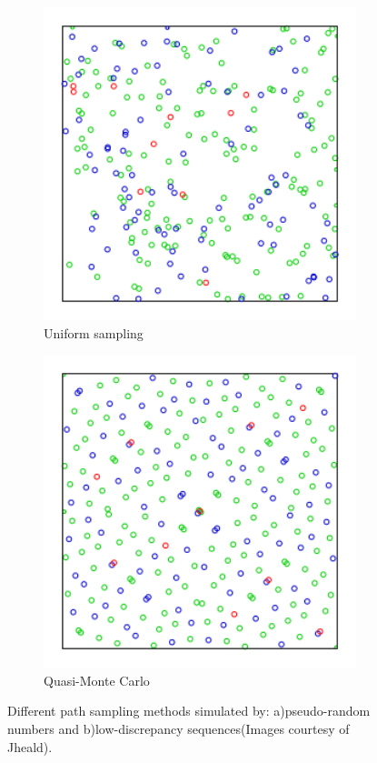 \begin{figure}\label{f:path-sampling-1}
	\begin{subfigure}[b]{0.4\textwidth}
		\includegraphics[width=1.0\textwidth]{graphics/gi/path-7-1}
		\caption{Uniform sampling}
	\end{subfigure}
	\begin{subfigure}[b]{0.4\textwidth}
		\includegraphics[width=1.0\textwidth]{graphics/gi/path-7-2}
		\caption{Quasi-Monte Carlo}
	\end{subfigure}
	\caption{Different path sampling methods simulated by: a)pseudo-random numbers and b)low-discrepancy sequences(Images courtesy of Jheald).}
\end{figure}


